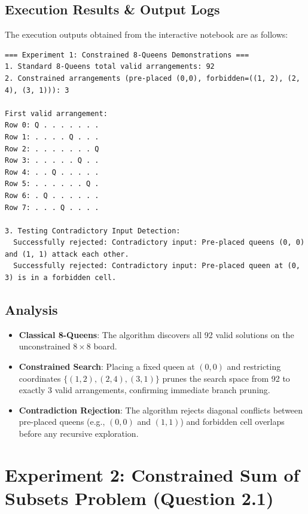 \documentclass[12pt]{article}
\begin{document}
\subsection{Execution Results \& Output Logs}
The execution outputs obtained from the interactive notebook are as follows:

\begin{lstlisting}[style=output]
=== Experiment 1: Constrained 8-Queens Demonstrations ===
1. Standard 8-Queens total valid arrangements: 92
2. Constrained arrangements (pre-placed (0,0), forbidden=((1, 2), (2, 4), (3, 1))): 3

First valid arrangement:
Row 0: Q . . . . . . .
Row 1: . . . . Q . . .
Row 2: . . . . . . . Q
Row 3: . . . . . Q . .
Row 4: . . Q . . . . .
Row 5: . . . . . . Q .
Row 6: . Q . . . . . .
Row 7: . . . Q . . . .

3. Testing Contradictory Input Detection:
  Successfully rejected: Contradictory input: Pre-placed queens (0, 0) and (1, 1) attack each other.
  Successfully rejected: Contradictory input: Pre-placed queen at (0, 3) is in a forbidden cell.

\end{lstlisting}

\subsection{Analysis}
\begin{itemize}
    \item \textbf{Classical 8-Queens}: The algorithm discovers all 92 valid solutions on the unconstrained $8 \times 8$ board.
    \item \textbf{Constrained Search}: Placing a fixed queen at $(0,0)$ and restricting coordinates $\{(1,2), (2,4), (3,1)\}$ prunes the search space from 92 to exactly 3 valid arrangements, confirming immediate branch pruning.
    \item \textbf{Contradiction Rejection}: The algorithm rejects diagonal conflicts between pre-placed queens (e.g., $(0,0)$ and $(1,1)$) and forbidden cell overlaps before any recursive exploration.
\end{itemize}

\section{Experiment 2: Constrained Sum of Subsets Problem (Question 2.1)}
\end{document}
